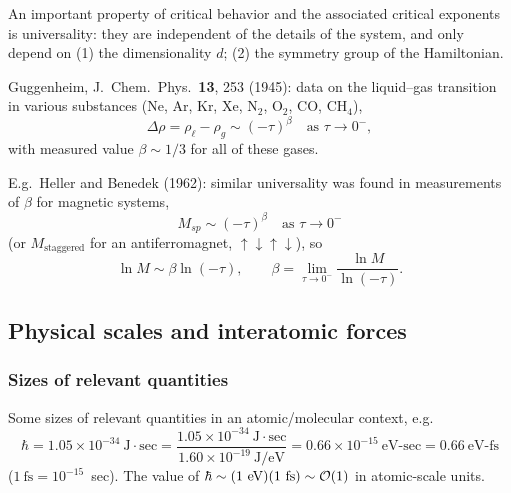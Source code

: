 An important property of critical behavior and the associated critical exponents is
universality: they are independent of the details of the system, and only depend on
(1) the dimensionality $d$; (2) the symmetry group of the Hamiltonian.

Guggenheim, J.\ Chem.\ Phys.\ \textbf{13}, 253 (1945): data on the liquid--gas
transition in various substances (Ne, Ar, Kr, Xe, N$_2$, O$_2$, CO, CH$_4$),
\begin{equation}
  \Delta\rho = \rho_\ell-\rho_g\sim(-\tau)^{\beta}\quad\text{as }\tau\to 0^-,
\end{equation}
with measured value $\beta\sim1/3$ for all of these gases.

\begin{diagram}
\end{diagram}

E.g.\ Heller and Benedek (1962): similar universality was found in measurements of
$\beta$ for magnetic systems,
\begin{equation}
  M_{sp}\sim(-\tau)^{\beta}\quad\text{as }\tau\to 0^-
\end{equation}
(or $M_{\text{staggered}}$ for an antiferromagnet, $\uparrow\downarrow\uparrow\downarrow$),
so
\begin{equation}
  \ln M\sim\beta\ln(-\tau),\qquad \beta = \lim_{\tau\to 0^-}\frac{\ln M}{\ln(-\tau)}.
\end{equation}

\subsection{Physical scales and interatomic forces}
\subsubsection*{Sizes of relevant quantities}

Some sizes of relevant quantities in an atomic/molecular context, e.g.
\begin{equation}
  \hbar = 1.05\times 10^{-34}\ \text{J}\cdot\text{sec}
  = \frac{1.05\times 10^{-34}\ \text{J}\cdot\text{sec}}{1.60\times 10^{-19}\ \text{J/eV}}
  = 0.66\times 10^{-15}\ \text{eV-sec} = 0.66\ \text{eV-fs}
\end{equation}
($1\ \text{fs} = 10^{-15}$~sec). The value of $\hbar\sim(1\ \text{eV})(1\ \text{fs})\sim
\Order(1)$ in atomic-scale units.

